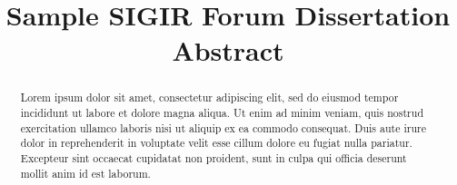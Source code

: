 \documentclass[dissertation]{sigirforum}
\begin{document}
\title{Sample SIGIR Forum Dissertation Abstract}


\maketitle 
\begin{abstract}
Lorem ipsum dolor sit amet, consectetur adipiscing elit, sed do eiusmod tempor incididunt ut labore et dolore magna aliqua. Ut enim ad minim veniam, quis nostrud exercitation ullamco laboris nisi ut aliquip ex ea commodo consequat. Duis aute irure dolor in reprehenderit in voluptate velit esse cillum dolore eu fugiat nulla pariatur. Excepteur sint occaecat cupidatat non proident, sunt in culpa qui officia deserunt mollit anim id est laborum.
\end{abstract}

\nocite{forum}


\end{document}
